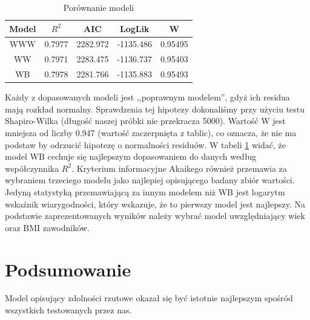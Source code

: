 \documentclass[11pt,a4paper]{article}
\begin{document}
\begin{table}[H]
	\begin{center}
		\begin{tabular}{| c | c | c | c | c |}
			\hline
			Model & $R^2$ & AIC & LogLik & W\\ \hline
			WWW & 0.7977 & 2282.972 & -1135.486 & 0.95495\\ \hline
			WW & 0.7971 & 2283.475 & -1136.737 & 0.95403\\ \hline 
			WB & 0.7978 & 2281.766 & -1135.883 & 0.95493\\ \hline  
		\end{tabular}
		\caption{Porównanie modeli}
		\label{porownanie_modeli_w}
	\end{center}
\end{table}
Każdy z dopasowanych modeli jest ,,poprawnym modelem'', gdyż ich residua mają rozkład normalny. Sprawdzenia tej hipotezy dokonaliśmy przy użyciu testu Shapiro-Wilka (długość naszej próbki nie przekracza 5000). Wartość W jest mniejsza od liczby 0.947 (wartość zaczerpnięta z tablic), co oznacza, że nie ma podstaw by odrzucić hipotezę o normalności residuów. W tabeli \ref{porownanie_modeli_w} widać, że model WB cechuje się najlepszym dopasowaniem do danych według współczynnika $R^2$. Kryterium informacyjne Akaikego również przemawia za wybraniem trzeciego modelu jako najlepiej opisującego badany zbiór wartości. Jedyną statystyką przemawiającą za innym modelem niż WB jest logarytm wskaźnik wiarygodności, który wskazuje, że to pierwszy model jest najlepszy. Na podstawie zaprezentowanych wyników należy wybrać model uwzględniający wiek oraz BMI zawodników.


\section{Podsumowanie}
Model opisujący zdolności rzutowe okazał się być istotnie najlepszym spośród wszystkich testowanych przez nas.  
\end{document}
